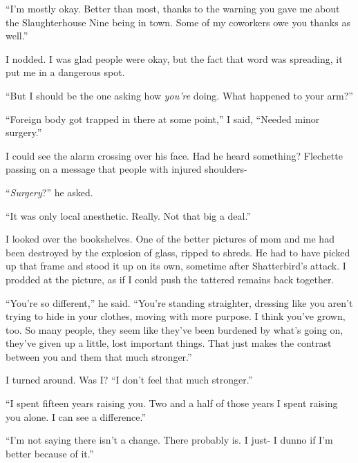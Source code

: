 ``I'm mostly okay.  Better than most, thanks to the warning you gave me about the Slaughterhouse Nine being in town.  Some of my coworkers owe you thanks as well.''



I nodded.  I was glad people were okay, but the fact that word was spreading, it put me in a dangerous spot.



``But I should be the one asking how \emph{you're} doing.  What happened to your arm?''



``Foreign body got trapped in there at some point,'' I said, ``Needed minor surgery.''



I could see the alarm crossing over his face.  Had he heard something?  Flechette passing on a message that people with injured shoulders-



``\emph{Surgery}?'' he asked.



``It was only local anesthetic.  Really.  Not that big a deal.''



I looked over the bookshelves.  One of the better pictures of mom and me had been destroyed by the explosion of glass, ripped to shreds.  He had to have picked up that frame and stood it up on its own, sometime after Shatterbird's attack.  I prodded at the picture, as if I could push the tattered remains back together.



``You're so different,'' he said.  ``You're standing straighter, dressing like you aren't trying to hide in your clothes, moving with more purpose.  I think you've grown, too.  So many people, they seem like they've been burdened by what's going on, they've given up a little, lost important things.  That just makes the contrast between you and them that much stronger.''



I turned around.  Was I?  ``I don't feel that much stronger.''



``I spent fifteen years raising you.  Two and a half of those years I spent raising you alone.  I can see a difference.''



``I'm not saying there isn't a change.  There probably is.  I just- I dunno if I'm better because of it.''



